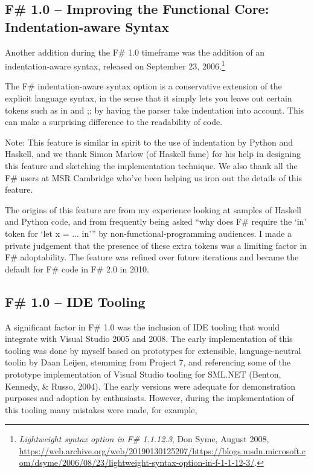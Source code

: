 \documentclass[acmsmall,review]{acmart}\settopmatter{printfolios=true,printccs=false,printacmref=false}
\begin{document}
\subsection*{F\# 1.0 – Improving the Functional Core: Indentation-aware Syntax}

Another addition during the F\# 1.0 timeframe was the addition of an indentation-aware syntax, released on
September 23, 2006.\footnote{\textit{Lightweight syntax option in F\# 1.1.12.3}, Don Syme, August 2008, \url{https://web.archive.org/web/20190130125207/https://blogs.msdn.microsoft.com/dsyme/2006/08/23/lightweight-syntax-option-in-f-1-1-12-3/}.}

\begin{verbquote}
The F# indentation-aware syntax option is a conservative extension of the explicit language syntax, in the sense that it simply lets you leave out certain tokens such as in and ;; by having the parser take indentation into account. This can make a surprising difference to the readability of code. 

Note: This feature is similar in spirit to the use of indentation by Python and Haskell, and we thank Simon Marlow (of Haskell fame) for his help in designing this feature and sketching the implementation technique. We also thank all the F# users at MSR Cambridge who've been helping us iron out the details of this feature. 
\end{verbquote}

The origins of this feature are from my experience looking at samples of Haskell and Python code, and from frequently
being asked “why does F\# require the ‘in’ token for ‘let x = ... in’” by non-functional-programming audiences.  I made
a private judgement that the presence of these extra tokens was a limiting factor in F\# adoptability.  The feature was refined
over future iterations and became the default for F\# code in F\# 2.0 in 2010.

\subsection*{F\# 1.0 – IDE Tooling}

A significant factor in F\# 1.0 was the inclusion of IDE tooling that would integrate with Visual Studio 2005 and 2008.
The early implementation of this tooling was done by myself based on prototypes for extensible, language-neutral toolin
 by Daan Leijen, stemming from Project 7, and referencing some of the prototype implementation of Visual Studio tooling
for SML.NET (Benton, Kennedy, \& Russo, 2004). The early versions were adequate for demonstration purposes and
adoption by enthusiasts.  However, during the implementation of this tooling many mistakes were made, for example, 
\end{document}
